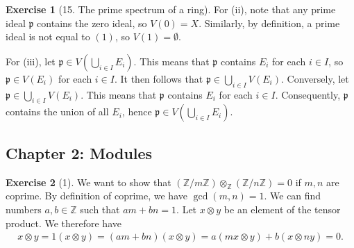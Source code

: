 \documentclass{article}
\theoremstyle{definition}
\newtheorem*{exercise}{Exercise}
\begin{document}
\begin{exercise}[15. The prime spectrum of a ring]
    For (ii), note that any prime ideal $\mathfrak{p}$ contains the
    zero ideal, so $V(0) = X$. Similarly, by definition, a prime ideal
    is not equal to $(1)$, so $V(1) = \emptyset$.

    For (iii), let $\mathfrak{p} \in V\left(\bigcup_{i \in I}
    E_i\right)$. This means that $\mathfrak{p}$ contains $E_i$ for
    each $i \in I$, so $\mathfrak{p} \in V(E_i)$ for each $i \in I$.
    It then follows that $\mathfrak{p} \in \bigcup_{i \in I} V(E_i)$.
    Conversely, let $\mathfrak{p} \in \bigcup_{i \in I} V(E_i)$. This
    means that $\mathfrak{p}$ contains $E_i$ for each $i \in I$.
    Consequently, $\mathfrak{p}$ contains the union of all $E_i$,
    hence $\mathfrak{p} \in V\left(\bigcup_{i \in I} E_i \right)$.
\end{exercise}

\subsection{Chapter 2: Modules}
\label{sec:chapter_2}

\begin{exercise}[1]
    We want to show that $\left( \mathbb{Z}/m\mathbb{Z}
    \right)\otimes_{\mathbb{Z}}  \left( \mathbb{Z} / n\mathbb{Z} \right) =
    0$ if $m, n$ are coprime. By definition of coprime, we have $\gcd(m, n)
    = 1$. We can find numbers $a, b \in \mathbb{Z}$ such that $am + bn =
    1$. Let $x \otimes y$ be an element of the tensor product. We therefore
    have
    \begin{align*}
        x \otimes y = 1 \left( x \otimes y \right) = (am + bn)(x
        \otimes y) = a(mx \otimes y) + b(x \otimes ny) = 0.
    \end{align*}
\end{exercise}
\end{document}
